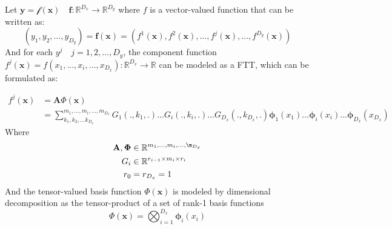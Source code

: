 \documentclass[11pt]{article}
\begin{document}
    Let $\mathbf{y}=\mathcal{f}(\mathbf{x}) \quad \mathbf{f}:\mathbb{R}^{D_x} \rightarrow \mathbb{R}^{D_y}$
    where $f$ is a vector-valued function\cite{Calculus40:online} that can be written as:
    \begin{equation}
        \label{eq:ftt-overall-formulation}
        (y_1,y_2,\dots,y_{D_y}) = \mathbf{f}(\mathbf{x}) = (f^1(\mathbf{x}),f^2(\mathbf{x}),\dots,f^j(\mathbf{x}),\dots,f^{D_y}(\mathbf{x}))
    \end{equation}
    And for each $y^j \quad j=1,2,\dots,D_y$, the component function \cite{Calculus40:online}
    $f^j(\mathbf{x})=f(x_1,\dots,x_i,\dots,x_{D_x}): \mathbb{R}^{D_x} \rightarrow \mathbb{R} $
    can be modeled as a FTT, which can be formulated as:

    \begin{equation}
        \label{eq:ftt}
        \begin{aligned}
            f^j(\mathbf{x}) &= \mathbf{A}\Phi(\mathbf{x})\\
            &=\sum_{k_1,k_2,\dots k_{D_x}}^{m_1,\dots,m_i,\dots,m_{D_x}}G_1(.,k_1,.)\dots G_i(.,k_i,.) \dots G_{D_x}(.,k_{D_x},.)\bm{\phi}_1(x_1)...\bm{\phi}_i(x_i)...\bm{\phi}_{D_x}(x_{D_x})
        \end{aligned}
    \end{equation}
    Where
    \begin{align*}
        \mathbf{A},\bm{\Phi} &\in \mathbb{R}^{m_1,\dots,m_{i},\dots,\m_{D_x}} \\
        G_i &\in \mathbb{R}^{r_{i-1} \times m_i \times r_i}\\
        r_{0}&=r_{D_x}=1
    \end{align*}
    And the tensor-valued basis function $\Phi(\mathbf{x})$ is modeled by dimensional decomposition as the tensor-product
    of a set of rank-1 basis functions
    \begin{equation}
        \label{eq:ftt-basis-fn-decomp}
            \Phi(\mathbf{x}) = \bigotimes_{i=1}^{D_x} \bm{\phi}_i(x_i)
    \end{equation}
\end{document}
